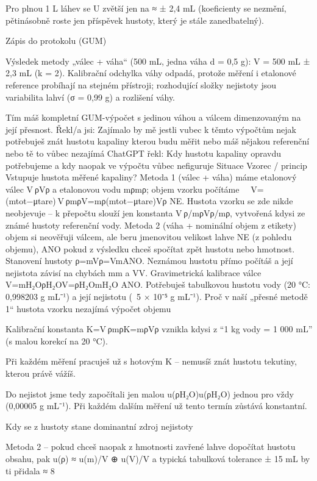 {    Pro plnou 1 L láhev se U zvětší jen na ≈ ± 2,4 mL (koeficienty se nezmění, pětinásobně roste jen příspěvek hustoty, který je stále zanedbatelný).

Zápis do protokolu (GUM)

    Výsledek metody „válec + váha“ (500 mL, jedna váha d = 0,5 g):
    V = 500 mL ± 2,3 mL (k = 2).
    Kalibrační odchylka váhy odpadá, protože měření i etalonové reference probíhají na stejném přístroji; rozhodující složky nejistoty jsou variabilita lahví (σ = 0,99 g) a rozlišení váhy.

Tím máš kompletní GUM-výpočet s jedinou váhou a válcem dimenzovaným na její přesnost.
Řekl/a jsi:
Zajímalo by mě jestli vubec k těmto výpočtům nejak potřebuješ znát hustotu kapaliny kterou budu měřit nebo máš nějakou referenční nebo tě to vůbec nezajímá
ChatGPT řekl:
Kdy hustotu kapaliny opravdu potřebujeme a kdy naopak ve výpočtu vůbec nefiguruje
Situace	Vzorec / princip	Vstupuje hustota měřené kapaliny?
Metoda 1 (válec + váha)
máme etalonový válec V ⁣ρVρ​ a etalonovou vodu mρmρ​; objem vzorku počítáme  V=(mtot−μtare) V ⁣ρmρV=mρ​(mtot​−μtare​)Vρ​​	NE. Hustota vzorku se zde nikde neobjevuje – k přepočtu slouží jen konstanta V ⁣ρ/mρVρ​/mρ​, vytvořená kdysi ze známé hustoty referenční vody.	
Metoda 2 (váha + nominální objem z etikety)
objem si neověřuji válcem, ale beru jmenovitou velikost lahve	NE (z pohledu objemu),
ANO pokud z výsledku chceš spočítat zpět hustotu nebo hmotnost.	
Stanovení hustoty
ρ=mVρ=Vm​	ANO. Neznámou hustotu přímo počítáš a její nejistota závisí na chybách mm a VV.	
Gravimetrická kalibrace válce
V=mH₂OρH₂OV=ρH₂O​mH₂O​​	ANO. Potřebuješ tabulkovou hustotu vody (20 °C: 0,998203 g mL⁻¹) a její nejistotu (~5 × 10⁻⁵ g mL⁻¹).	
Proč v naší „přesné metodě 1“ hustota vzorku nezajímá výpočet objemu

    Kalibrační konstanta
    K=V ⁣ρmρK=mρ​Vρ​​
    vznikla kdysi z “1 kg vody = 1 000 mL” (s malou korekcí na 20 °C).

    Při každém měření pracuješ už s hotovým K – nemusíš znát hustotu tekutiny, kterou právě vážíš.

    Do nejistot jsme tedy započítali jen malou u(ρH₂O)u(ρH₂O​) jednou pro vždy (0,00005 g mL⁻¹). Při každém dalším měření už tento termín zůstává konstantní.

Kdy se z hustoty stane dominantní zdroj nejistoty

    Metoda 2 – pokud chceš naopak z hmotnosti zavřené lahve dopočítat hustotu obsahu, pak u(ρ) ≈ u(m)/V ⊕ u(V)/V a typická tabulková tolerance ± 15 mL by ti přidala ≈ 8 %

}
